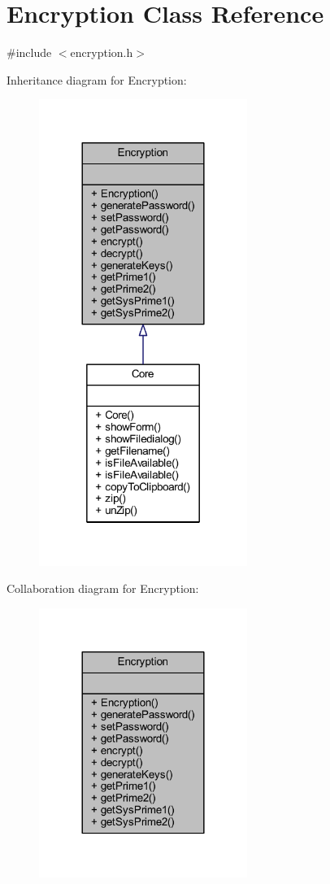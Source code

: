 \hypertarget{class_encryption}{}\section{Encryption Class Reference}
\label{class_encryption}


{\ttfamily \#include $<$encryption.\+h$>$}



Inheritance diagram for Encryption\+:
\nopagebreak
\begin{figure}[H]
\begin{center}
\leavevmode
\includegraphics[width=192pt]{class_encryption__inherit__graph}
\end{center}
\end{figure}


Collaboration diagram for Encryption\+:
\nopagebreak
\begin{figure}[H]
\begin{center}
\leavevmode
\includegraphics[width=192pt]{class_encryption__coll__graph}
\end{center}
\end{figure}
